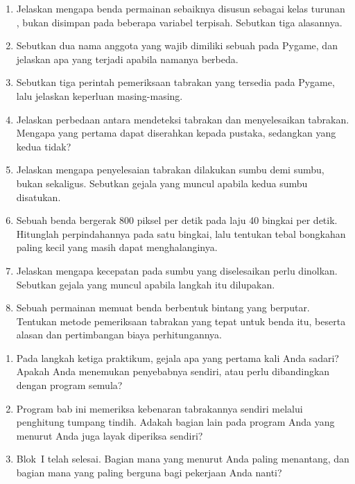 
\begin{enumerate}
  \item Jelaskan mengapa benda permainan sebaiknya disusun sebagai kelas
        turunan , bukan disimpan pada beberapa
        variabel terpisah. Sebutkan tiga alasannya.

  \item Sebutkan dua nama anggota yang wajib dimiliki sebuah 
        pada Pygame, dan jelaskan apa yang terjadi apabila namanya berbeda.

  \item Sebutkan tiga perintah pemeriksaan tabrakan yang tersedia pada Pygame,
        lalu jelaskan keperluan masing-masing.

  \item Jelaskan perbedaan antara mendeteksi tabrakan dan menyelesaikan
        tabrakan. Mengapa yang pertama dapat diserahkan kepada pustaka,
        sedangkan yang kedua tidak?

  \item Jelaskan mengapa penyelesaian tabrakan dilakukan sumbu demi sumbu,
        bukan sekaligus. Sebutkan gejala yang muncul apabila kedua sumbu
        disatukan.

  \item Sebuah benda bergerak 800 piksel per detik pada laju 40 bingkai per
        detik. Hitunglah perpindahannya pada satu bingkai, lalu tentukan tebal
        bongkahan paling kecil yang masih dapat menghalanginya.

  \item Jelaskan mengapa kecepatan pada sumbu yang diselesaikan perlu dinolkan.
        Sebutkan gejala yang muncul apabila langkah itu dilupakan.

  \item Sebuah permainan memuat benda berbentuk bintang yang berputar.
        Tentukan metode pemeriksaan tabrakan yang tepat untuk benda itu,
        beserta alasan dan pertimbangan biaya perhitungannya.
\end{enumerate}

\begin{refleksibox}
\begin{enumerate}
  \item Pada langkah ketiga praktikum, gejala apa yang pertama kali Anda
        sadari? Apakah Anda menemukan penyebabnya sendiri, atau perlu
        dibandingkan dengan program semula?
  \item Program bab ini memeriksa kebenaran tabrakannya
        sendiri melalui penghitung tumpang tindih. Adakah bagian lain pada
        program Anda yang menurut Anda juga layak diperiksa sendiri?
  \item Blok~I telah selesai. Bagian mana yang menurut Anda paling menantang,
        dan bagian mana yang paling berguna bagi pekerjaan Anda nanti?
\end{enumerate}
\end{refleksibox}
